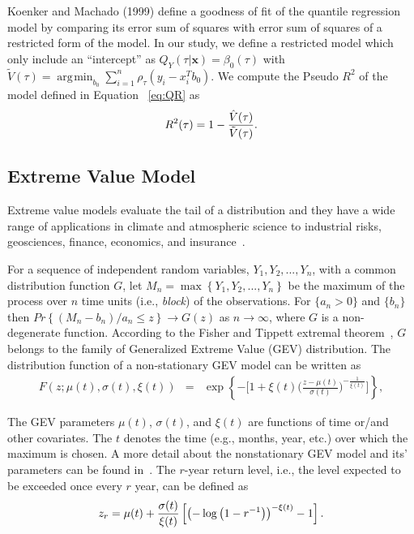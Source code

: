 \documentclass[review]{elsarticle}
\DeclareMathOperator*{\argmin}{\arg\!\min}
\begin{document}
Koenker and Machado (1999) define a goodness of fit of the quantile regression model by comparing its error sum of squares with error sum of squares of a restricted form of the model. In our study, we define a restricted model which only include an ``intercept''
as $Q_Y (\tau|\mathbf{x}) = \beta_0(\tau)$ with 
$\tilde{V} (\tau) = \argmin_{b_0} \sum\limits_{i=1}^n \rho_\tau (y_i - x_i^T b_0)$. We  compute the Pseudo $R^2$ of the model defined in Equation ~\ref{eq:QR} as
\begin{eqnarray}\label{eq:R1}
R^2 (\tau) = 1 - {\hat{V} (\tau) \over \tilde{V} (\tau)}.
\end{eqnarray}


\subsection{Extreme Value Model}

Extreme value models evaluate the tail of a distribution and they have a wide range of applications in climate and atmospheric science to industrial risks, geosciences, finance, economics, and insurance~\citep{castrocamilo2018,Castillo2005,Chen2019,Das2016,Dey2016,Brian2019,reich2012}.  



For a sequence of independent random variables, $Y_1, Y_2,...,Y_n$, with a common distribution function $G$, let $M_n=\max\left\lbrace Y_1, Y_2,...,Y_n\right\rbrace$ be the maximum of the process over $n$ time units (i.e., \textit{block}) of the observations. For $\{a_n >0\}$ and $\{b_n\}$ then $Pr\left\lbrace \left(M_n - b_n \right)/a_n \leq z\right\rbrace \rightarrow G(z)$ as $n \rightarrow \infty$, where $G$ is a non-degenerate function.
According to the Fisher and Tippett extremal theorem~\citep{fisher_tippett_1928}, 
$G$ belongs to the family of Generalized Extreme Value (GEV) distribution. The distribution function of a non-stationary GEV model can be written as
\begin{eqnarray}\label{eq:Q3} 
F\left(z;\mu(t),\sigma(t),\xi(t)\right)  &=& \exp\left\lbrace-\Big[1+\xi(t) \Big(\frac{z-\mu(t)}{\sigma (t)}\Big)^{-\frac{1}{\xi(t)}}\Big]\right\rbrace,
\end{eqnarray}

The GEV parameters $\mu(t)$, $\sigma(t)$, and $\xi(t)$ are functions of time or/and other covariates. The $t$ denotes the time (e.g., months, year, etc.) over which the maximum is chosen.  A more detail about the nonstationary GEV model and its' parameters can be found in~\citep{Coles2001,Dey2020}. 
 The $r$-year return level, i.e., the level expected to be exceeded once every $r$ year, can be defined as 
\begin{eqnarray}\label{retun_2}
z_r=\mu(t) + {\sigma(t)\over \xi(t)} \left[ {\left( -\log \left(1- r^{-1}\right)\right) ^{-\xi(t)}}-1\right].
\end{eqnarray}
\end{document}
